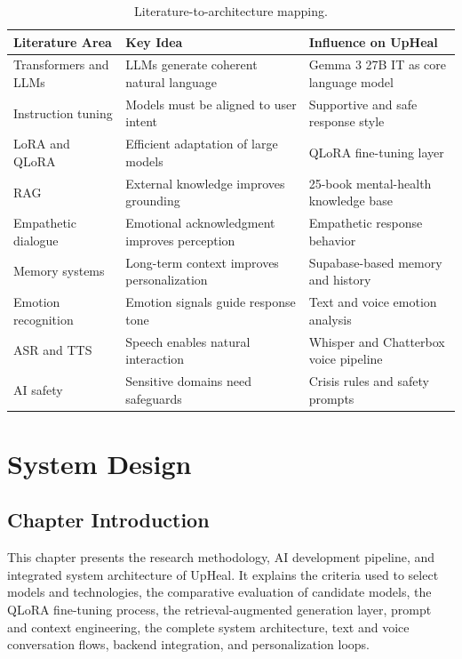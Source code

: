 \documentclass[12pt,a4paper,oneside,openany]{report}
\begin{document}
\begin{table}[H]
\centering\small
\caption{Literature-to-architecture mapping.}
\label{tab:litmapping}
\begin{tabular}{@{}lll@{}}
\toprule
Literature Area & Key Idea & Influence on UpHeal \\
\midrule
Transformers and LLMs & LLMs generate coherent natural language & Gemma 3 27B IT as core language model \\
Instruction tuning & Models must be aligned to user intent & Supportive and safe response style \\
LoRA and QLoRA & Efficient adaptation of large models & QLoRA fine-tuning layer \\
RAG & External knowledge improves grounding & 25-book mental-health knowledge base \\
Empathetic dialogue & Emotional acknowledgment improves perception & Empathetic response behavior \\
Memory systems & Long-term context improves personalization & Supabase-based memory and history \\
Emotion recognition & Emotion signals guide response tone & Text and voice emotion analysis \\
ASR and TTS & Speech enables natural interaction & Whisper and Chatterbox voice pipeline \\
AI safety & Sensitive domains need safeguards & Crisis rules and safety prompts \\
\bottomrule
\end{tabular}
\end{table}

\chapter{System Design}
\label{ch:design}

\section{Chapter Introduction}

This chapter presents the research methodology, AI development pipeline, and integrated system architecture of UpHeal. It explains the criteria used to select models and technologies, the comparative evaluation of candidate models, the QLoRA fine-tuning process, the retrieval-augmented generation layer, prompt and context engineering, the complete system architecture, text and voice conversation flows, backend integration, and personalization loops.
\end{document}
